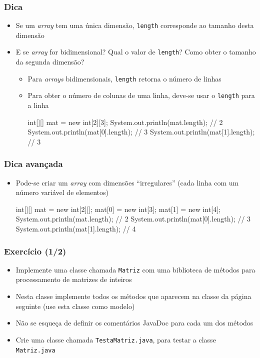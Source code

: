 \documentclass[xcolor={dvipsnames,table},aspectratio=169]{beamer}
\begin{document}
\begin{frame}[fragile]	\frametitle{Dica}
\begin{itemize}
	\item Se um \emph{array} tem uma única dimensão, \texttt{length} corresponde ao tamanho desta dimensão
	\item E se \emph{array} for bidimensional? Qual o valor de \texttt{length}? Como obter o tamanho da segunda dimensão?
	\begin{itemize}
		\item Para \emph{arrays} bidimensionais, \texttt{length} retorna o número de linhas
		\item Para obter o número de colunas de uma linha, deve-se usar o \texttt{length} para a linha
{\scriptsize
\begin{javacode}
int[][] mat = new int[2][3];
System.out.println(mat.length);    // 2
System.out.println(mat[0].length); // 3
System.out.println(mat[1].length); // 3
\end{javacode}
}
	\end{itemize}
\end{itemize}
\end{frame}

\begin{frame}[fragile]\frametitle{Dica avançada}
\begin{itemize}
	\item Pode-se criar um \emph{array} com dimensões ``irregulares'' (cada linha com um número variável de elementos)
{\scriptsize
\begin{javacode}
int[][] mat = new int[2][];
mat[0] = new int[3];
mat[1] = new int[4];
System.out.println(mat.length);    // 2
System.out.println(mat[0].length); // 3
System.out.println(mat[1].length); // 4
\end{javacode}
}
\end{itemize}
\end{frame}

\begin{frame}[fragile]\frametitle{Exercício (1/2)}
\begin{itemize}
	\item Implemente uma classe chamada \texttt{Matriz} com uma biblioteca de métodos para processamento de matrizes de inteiros
	\item Nesta classe implemente todos os métodos que aparecem na classe da página seguinte (use esta classe como modelo)
	\item Não se esqueça de definir os comentários JavaDoc para cada um dos métodos
	\item Crie uma classe chamada \texttt{TestaMatriz.java}, para testar a classe \texttt{Matriz.java}
\end{itemize}
\end{frame}
\end{document}
